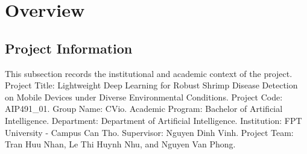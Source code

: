 \section{Overview}
\subsection{Project Information}
This subsection records the institutional and academic context of the project. Project Title: Lightweight Deep Learning for Robust Shrimp Disease Detection on Mobile Devices under Diverse Environmental Conditions. Project Code: AIP491\_01. Group Name: CVio. Academic Program: Bachelor of Artificial Intelligence. Department: Department of Artificial Intelligence. Institution: FPT University - Campus Can Tho. Supervisor: Nguyen Dinh Vinh. Project Team: Tran Huu Nhan, Le Thi Huynh Nhu, and Nguyen Van Phong.\par
\begingroup
\CVioTableSetup
